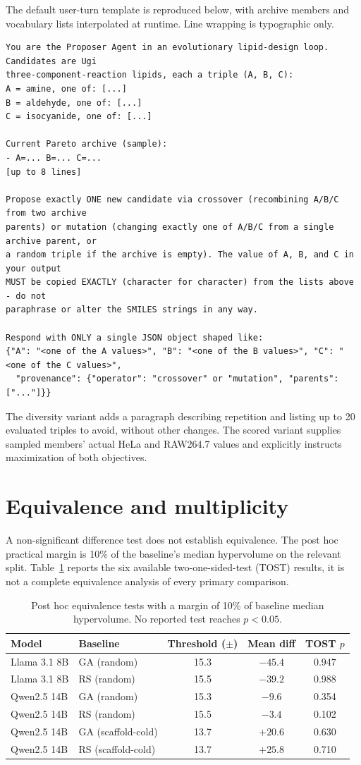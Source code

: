 The default user-turn template is reproduced below, with archive members and vocabulary lists interpolated at runtime. Line wrapping is typographic only.
\begin{Verbatim}[fontsize=\small,breaklines,breakanywhere]
You are the Proposer Agent in an evolutionary lipid-design loop. Candidates are Ugi
three-component-reaction lipids, each a triple (A, B, C):
A = amine, one of: [...]
B = aldehyde, one of: [...]
C = isocyanide, one of: [...]

Current Pareto archive (sample):
- A=... B=... C=...
[up to 8 lines]

Propose exactly ONE new candidate via crossover (recombining A/B/C from two archive
parents) or mutation (changing exactly one of A/B/C from a single archive parent, or
a random triple if the archive is empty). The value of A, B, and C in your output
MUST be copied EXACTLY (character for character) from the lists above - do not
paraphrase or alter the SMILES strings in any way.

Respond with ONLY a single JSON object shaped like:
{"A": "<one of the A values>", "B": "<one of the B values>", "C": "<one of the C values>",
  "provenance": {"operator": "crossover" or "mutation", "parents": ["..."]}}
\end{Verbatim}
The diversity variant adds a paragraph describing repetition and listing up to 20 evaluated triples to avoid, without other changes. The scored variant supplies sampled members' actual HeLa and RAW264.7 values and explicitly instructs maximization of both objectives.

\section{Equivalence and multiplicity}
\label{app:equivalence}
A non-significant difference test does not establish equivalence. The post hoc practical margin is 10\% of the baseline's median hypervolume on the relevant split. Table~\ref{tab:tost} reports the six available two-one-sided-test (TOST) results, it is not a complete equivalence analysis of every primary comparison.

\begin{table}[htbp]
\caption{Post hoc equivalence tests with a margin of 10\% of baseline median hypervolume. No reported test reaches $p<0.05$.}
\label{tab:tost}
\centering
\begin{tabular}{@{}llccc@{}}
\toprule
Model & Baseline & Threshold ($\pm$) & Mean diff & TOST $p$ \\
\midrule
Llama 3.1 8B & GA (random) & 15.3 & $-45.4$ & 0.947 \\
Llama 3.1 8B & RS (random) & 15.5 & $-39.2$ & 0.988 \\
Qwen2.5 14B & GA (random) & 15.3 & $-9.6$ & 0.354 \\
Qwen2.5 14B & RS (random) & 15.5 & $-3.4$ & 0.102 \\
Qwen2.5 14B & GA (scaffold-cold) & 13.7 & $+20.6$ & 0.630 \\
Qwen2.5 14B & RS (scaffold-cold) & 13.7 & $+25.8$ & 0.710 \\
\bottomrule
\end{tabular}
\end{table}

